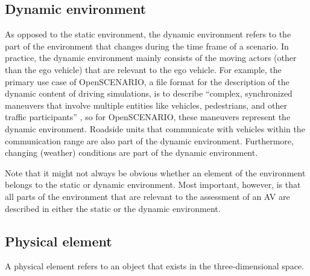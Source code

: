 \subsection{Dynamic environment}
\label{sec:dynamic environment}

As opposed to the static environment, the dynamic environment refers to the part of the environment that changes during the time frame of a scenario. 
In practice, the dynamic environment mainly consists of the moving actors (other than the ego vehicle) that are relevant to the ego vehicle.
For example, the primary use case of OpenSCENARIO, a file format for the description of the dynamic content of driving simulations, is to describe ``complex, synchronized maneuvers that involve multiple entities like vehicles, pedestrians, and other traffic participants'' \autocite{openscenario}, so for OpenSCENARIO, these maneuvers represent the dynamic environment.
Roadside units that communicate with vehicles within the communication range \autocite{alsultan2014comprehensive} are also part of the dynamic environment. Furthermore, changing (weather) conditions are part of the dynamic environment.

\begin{remark}
	Note that it might not always be obvious whether an element of the environment belongs to the static or dynamic environment. 
	Most important, however, is that all parts of the environment that are relevant to the assessment of an AV are described in either the static or the dynamic environment.
\end{remark}



\cstarte
\subsection{Physical element}
\label{sec:physical element}


A physical element refers to an object that exists in the three-dimensional space.
\cende


%
%
%
%
%



